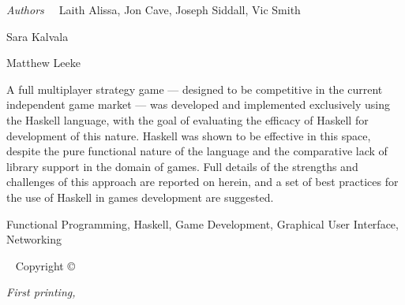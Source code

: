 \newpage
\begin{fullwidth}
	{\large {\it Authors\ \ } Laith Alissa, Jon Cave, Joseph Siddall, Vic Smith
	
	\vspace{1em} Sara Kalvala
	
	\vspace{1em} Matthew Leeke
	
	\vspace{1em} A full multiplayer strategy game --- designed to be competitive in the current independent game market --- was developed and implemented exclusively using the Haskell language, with the goal of evaluating the efficacy of Haskell for development of this nature. Haskell was shown to be effective in this space, despite the pure functional nature of the language and the comparative lack of library support in the domain of games. Full details of the strengths and challenges of this approach are reported on herein, and a set of best practices for the use of Haskell in games development are suggested. 
	
	\vspace{1em} Functional Programming, Haskell, Game Development, Graphical User Interface, Networking
	
	}
	
	~\vfill
	\thispagestyle{empty}
	\setlength{\parindent}{0pt}
	\setlength{\parskip}{\baselineskip}
	Copyright \copyright\ \the\year\ \plainauthor
	
	\par{}
	
	
	\par\textit{First printing, \monthyear}

	\newpage

\end{fullwidth}



